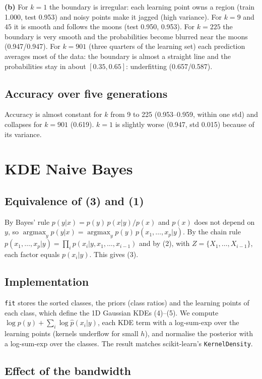 \documentclass[10pt,a4paper]{article}
\begin{document}
\textbf{(b)} For $k{=}1$ the boundary is irregular: each learning point owns a region (train 1.000, test 0.953) and noisy points make it jagged (high variance). For $k{=}9$ and $45$ it is smooth and follows the moons (test 0.950, 0.953). For $k{=}225$ the boundary is very smooth and the probabilities become blurred near the moons (0.947/0.947). For $k{=}901$ (three quarters of the learning set) each prediction averages most of the data: the boundary is almost a straight line and the probabilities stay in about $[0.35, 0.65]$: underfitting (0.657/0.587).

\subsection{Accuracy over five generations}
Accuracy is almost constant for $k$ from 9 to 225 (0.953--0.959, within one std) and collapses for $k{=}901$ (0.619). $k{=}1$ is slightly worse (0.947, std 0.015) because of its variance.

\section{KDE Naive Bayes}
\subsection{Equivalence of (3) and (1)}
By Bayes' rule $p(y|x)=p(y)\,p(x|y)/p(x)$ and $p(x)$ does not depend on $y$, so $\operatorname{argmax}_y p(y|x)=\operatorname{argmax}_y p(y)\,p(x_1,\dots,x_p|y)$. By the chain rule $p(x_1,\dots,x_p|y)=\prod_{i}p(x_i|y,x_1,\dots,x_{i-1})$ and by (2), with $Z=\{X_1,\dots,X_{i-1}\}$, each factor equals $p(x_i|y)$. This gives (3).

\subsection{Implementation}
\texttt{fit} stores the sorted classes, the priors (class ratios) and the learning points of each class, which define the 1D Gaussian KDEs (4)--(5). We compute $\log p(y)+\sum_i\log\hat p(x_i|y)$, each KDE term with a log-sum-exp over the learning points (kernels underflow for small $h$), and normalise the posterior with a log-sum-exp over the classes. The result matches scikit-learn's \texttt{KernelDensity}.

\subsection{Effect of the bandwidth}
\end{document}
